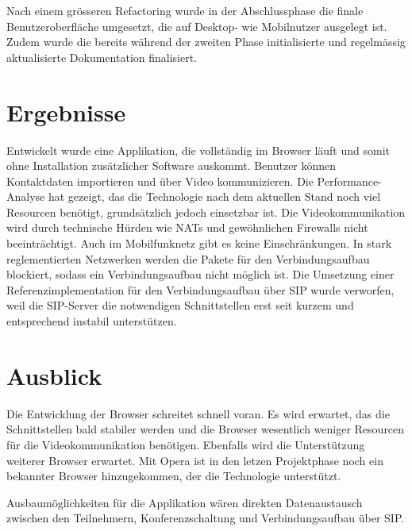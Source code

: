 Nach einem grösseren Refactoring wurde in der Abschlussphase die finale Benutzeroberfläche umgesetzt, die auf Desktop- wie Mobilnutzer ausgelegt ist.
Zudem wurde die bereits während der zweiten Phase initialisierte und regelmässig aktualisierte Dokumentation finalisiert.


\section{Ergebnisse}
Entwickelt wurde eine Applikation, die vollständig im Browser läuft und somit ohne Installation zusätzlicher Software auskommt.
Benutzer können Kontaktdaten importieren und über Video kommunizieren.
Die Performance-Analyse hat gezeigt, das die Technologie nach dem aktuellen Stand noch viel Resourcen benötigt, grundsätzlich jedoch einsetzbar ist.
Die Videokommunikation wird durch technische Hürden wie NATs und gewöhnlichen Firewalls nicht beeinträchtigt. Auch im Mobilfunknetz gibt es keine Einschränkungen.
In stark reglementierten Netzwerken werden die Pakete für den Verbindungsaufbau blockiert, sodass ein Verbindungsaufbau nicht möglich ist.
Die Umsetzung einer Referenzimplementation für den Verbindungsaufbau über SIP wurde verworfen, weil die SIP-Server die notwendigen Schnittstellen erst seit kurzem und entsprechend instabil unterstützen.


\section{Ausblick}
Die Entwicklung der Browser schreitet schnell voran. Es wird erwartet, das die Schnittstellen bald stabiler werden und die Browser wesentlich weniger Resourcen für die Videokommunikation benötigen. Ebenfalls wird die Unterstützung weiterer Browser erwartet. Mit Opera ist in den letzen Projektphase noch ein bekannter Browser hinzugekommen, der die Technologie unterstützt.

Ausbaumöglichkeiten für die Applikation wären direkten Datenaustausch zwischen den Teilnehmern, Konferenzschaltung und Verbindungsaufbau über SIP.
